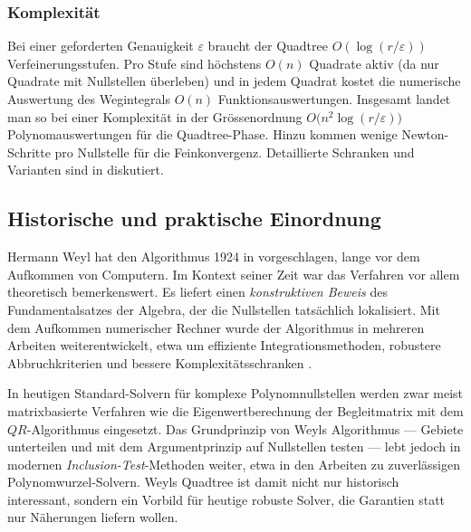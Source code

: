 \subsubsection*{Komplexität}
Bei einer geforderten Genauigkeit $\varepsilon$ braucht der Quadtree
$O(\log(r/\varepsilon))$ Verfeinerungsstufen.
Pro Stufe sind höchstens $O(n)$ Quadrate aktiv (da nur Quadrate mit
Nullstellen überleben) und in jedem Quadrat kostet die numerische Auswertung des
Wegintegrals $O(n)$ Funktionsauswertungen.
Insgesamt landet man so bei einer Komplexität in der Grössenordnung
$O\bigl(n^2 \log(r/\varepsilon)\bigr)$ Polynomauswertungen für die
Quadtree-Phase. Hinzu kommen wenige Newton-Schritte pro Nullstelle für die
Feinkonvergenz.
Detaillierte Schranken und Varianten sind in \cite{weyl:pan1998} diskutiert.

\subsection{Historische und praktische Einordnung%
\label{weyl:subsection:historisch}}
Hermann Weyl hat den Algorithmus 1924 in \cite{weyl:weyl1924} vorgeschlagen, lange vor
dem Aufkommen von Computern.
Im Kontext seiner Zeit war das Verfahren vor allem theoretisch bemerkenswert.
Es liefert einen \emph{konstruktiven Beweis} des Fundamentalsatzes der Algebra, der die
Nullstellen tatsächlich lokalisiert.
%
Mit dem Aufkommen numerischer Rechner wurde der Algorithmus in mehreren Arbeiten
weiterentwickelt, etwa um effiziente Integrationsmethoden, robustere Abbruchkriterien
und bessere Komplexitätsschranken
\cite{weyl:pan1998}.

In heutigen Standard-Solvern für komplexe Polynomnullstellen werden zwar meist
matrixbasierte Verfahren wie die Eigenwertberechnung der Begleitmatrix mit dem
%
$\mathit{QR}$-Algorithmus eingesetzt. Das Grundprinzip von Weyls Algorithmus --- Gebiete
%
unterteilen und mit dem Argumentprinzip auf Nullstellen testen --- lebt jedoch in
modernen \emph{Inclusion-Test}-Methoden weiter, etwa in den Arbeiten zu
zuverlässigen Polynomwurzel-Solvern.
%
Weyls Quadtree ist damit nicht nur historisch interessant, sondern ein Vorbild für
heutige robuste Solver, die Garantien statt nur Näherungen liefern wollen.


